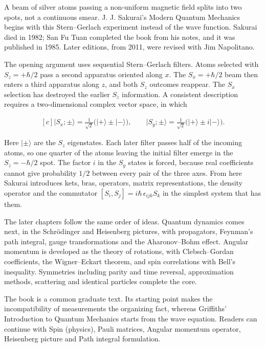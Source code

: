 \documentclass[11pt,oneside]{book}
\newenvironment{centeredalign}{\[\begin{gathered}[c]}{\end{gathered}\]}
\newcommand{\ket}[1]{\lvert #1\rangle}
\begin{document}
A beam of silver atoms passing a non-uniform magnetic field splits into two spots, not a continuous smear. J. J. Sakurai's Modern Quantum Mechanics begins with this Stern--Gerlach experiment instead of the wave function. Sakurai died in 1982; San Fu Tuan completed the book from his notes, and it was published in 1985. Later editions, from 2011, were revised with Jim Napolitano.

The opening argument uses sequential Stern--Gerlach filters. Atoms selected with \(S_z=+\hbar/2\) pass a second apparatus oriented along \(x\). The \(S_x=+\hbar/2\) beam then enters a third apparatus along \(z\), and both \(S_z\) outcomes reappear. The \(S_x\) selection has destroyed the earlier \(S_z\) information. A consistent description requires a two-dimensional complex vector space, in which

\begin{centeredalign}
\ket{S_x;\pm}=\frac{1}{\sqrt2}\bigl(\ket{+}\pm\ket{-}\bigr),\qquad
\ket{S_y;\pm}=\frac{1}{\sqrt2}\bigl(\ket{+}\pm i\ket{-}\bigr).
\end{centeredalign}

Here \(\ket{\pm}\) are the \(S_z\) eigenstates. Each later filter passes half of the incoming atoms, so one quarter of the atoms leaving the initial filter emerge in the \(S_z=-\hbar/2\) spot. The factor \(i\) in the \(S_y\) states is forced, because real coefficients cannot give probability \(1/2\) between every pair of the three axes. From here Sakurai introduces kets, bras, operators, matrix representations, the density operator and the commutator \([S_i,S_j]=i\hbar\,\epsilon_{ijk}S_k\) in the simplest system that has them.

The later chapters follow the same order of ideas. Quantum dynamics comes next, in the Schrödinger and Heisenberg pictures, with propagators, Feynman's path integral, gauge transformations and the Aharonov--Bohm effect. Angular momentum is developed as the theory of rotations, with Clebsch--Gordan coefficients, the Wigner--Eckart theorem, and spin correlations with Bell's inequality. Symmetries including parity and time reversal, approximation methods, scattering and identical particles complete the core.

The book is a common graduate text. Its starting point makes the incompatibility of measurements the organizing fact, whereas Griffiths' Introduction to Quantum Mechanics starts from the wave equation. Readers can continue with Spin (physics), Pauli matrices, Angular momentum operator, Heisenberg picture and Path integral formulation.
\end{document}
